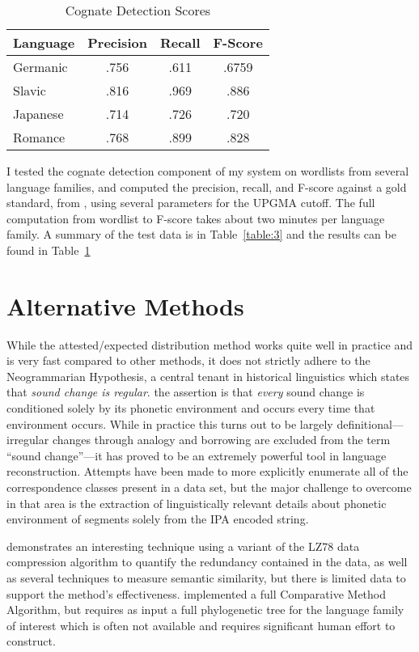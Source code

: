 \documentclass[doc,natbib,11pt]{apa6}
\begin{document}
\begin{table}
	\centering
	\begin{tabular}{|l|ccc|}\hline
	Language & Precision & Recall & F-Score\\\hline
	Germanic & .756 & .611 & .6759\\
	Slavic & .816 & .969 & .886 \\
	Japanese & .714 & .726 & .720\\
	Romance & .768 & .899 & .828\\\hline
	\end{tabular}
	\caption{Cognate Detection Scores}
	\label{table:4}
\end{table}

I tested the cognate detection component of my system on wordlists from several language families, and computed the precision, recall, and F-score against a gold standard, from \citet{List2014}, using several parameters for the UPGMA cutoff. The full computation from wordlist to F-score takes about two minutes per language family. A summary of the test data is in Table~\ref{table:3} and the results can be found in Table~\ref{table:4}

\section{Alternative Methods}

While the attested/expected distribution method works quite well in practice and is very fast compared to other methods, it does not strictly adhere to the Neogrammarian Hypothesis, a central tenant in historical linguistics which states that \emph{sound change is regular}. the assertion is that \emph{every} sound change is conditioned solely by its phonetic environment and occurs every time that environment occurs. While in practice this turns out to be largely definitional---irregular changes through analogy and borrowing are excluded from the term ``sound change''---it has proved to be an extremely powerful tool in language reconstruction. Attempts have been made to more explicitly enumerate all of the correspondence classes present in a data set, but the major challenge to overcome in that area is the extraction of linguistically relevant details about phonetic environment of segments solely from the IPA encoded string. 

\citet{Steiner2011} demonstrates an interesting technique using a variant of the LZ78 data compression algorithm to quantify the redundancy contained in the data, as well as several techniques to measure semantic similarity, but there is limited data to support the method's effectiveness. 
\citet{Gilman2013} implemented a full Comparative Method Algorithm, but requires as input a full phylogenetic tree for the language family of interest which is often not available and requires significant human effort to construct. 
\end{document}
